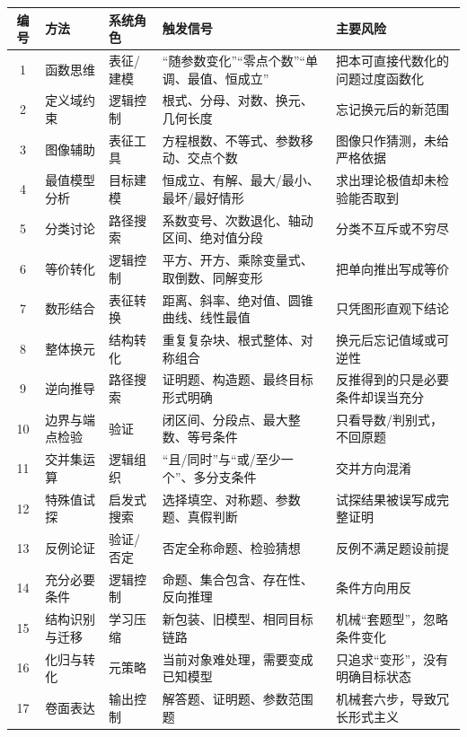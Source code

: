 \documentclass[11pt,a4paper]{ctexart}
\begin{document}
\small
\begin{longtable}{c p{2.6cm} p{2.4cm} p{5.0cm} p{4.3cm}}
\toprule
\textbf{编号} & \textbf{方法} & \textbf{系统角色} & \textbf{触发信号} & \textbf{主要风险}\\
\midrule
\endhead
1 & 函数思维 & 表征/建模 & “随参数变化”“零点个数”“单调、最值、恒成立” & 把本可直接代数化的问题过度函数化\\ \hline
2 & 定义域约束 & 逻辑控制 & 根式、分母、对数、换元、几何长度 & 忘记换元后的新范围\\ \hline
3 & 图像辅助 & 表征工具 & 方程根数、不等式、参数移动、交点个数 & 图像只作猜测，未给严格依据\\ \hline
4 & 最值模型分析 & 目标建模 & 恒成立、有解、最大/最小、最坏/最好情形 & 求出理论极值却未检验能否取到\\ \hline
5 & 分类讨论 & 路径搜索 & 系数变号、次数退化、轴动区间、绝对值分段 & 分类不互斥或不穷尽\\ \hline
6 & 等价转化 & 逻辑控制 & 平方、开方、乘除变量式、取倒数、同解变形 & 把单向推出写成等价\\ \hline
7 & 数形结合 & 表征转换 & 距离、斜率、绝对值、圆锥曲线、线性最值 & 只凭图形直观下结论\\ \hline
8 & 整体换元 & 结构转化 & 重复复杂块、根式整体、对称组合 & 换元后忘记值域或可逆性\\ \hline
9 & 逆向推导 & 路径搜索 & 证明题、构造题、最终目标形式明确 & 反推得到的只是必要条件却误当充分\\ \hline
10 & 边界与端点检验 & 验证 & 闭区间、分段点、最大整数、等号条件 & 只看导数/判别式，不回原题\\ \hline
11 & 交并集运算 & 逻辑组织 & “且/同时”与“或/至少一个”、多分支条件 & 交并方向混淆\\ \hline
12 & 特殊值试探 & 启发式搜索 & 选择填空、对称题、参数题、真假判断 & 试探结果被误写成完整证明\\ \hline
13 & 反例论证 & 验证/否定 & 否定全称命题、检验猜想 & 反例不满足题设前提\\ \hline
14 & 充分必要条件 & 逻辑控制 & 命题、集合包含、存在性、反向推理 & 条件方向用反\\ \hline
15 & 结构识别与迁移 & 学习压缩 & 新包装、旧模型、相同目标链路 & 机械“套题型”，忽略条件变化\\ \hline
16 & 化归与转化 & 元策略 & 当前对象难处理，需要变成已知模型 & 只追求“变形”，没有明确目标状态\\ \hline
17 & 卷面表达 & 输出控制 & 解答题、证明题、参数范围题 & 机械套六步，导致冗长形式主义\\
\bottomrule
\end{longtable}
\normalsize
\end{document}

